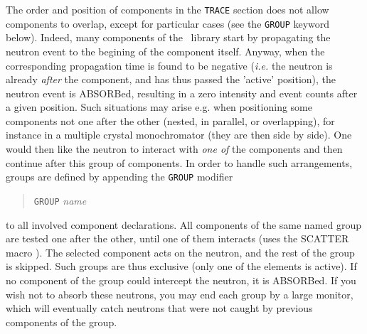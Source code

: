 The order and position of components in the \texttt{TRACE} section does not
allow components to overlap, except for particular cases (see the \texttt{GROUP} keyword below).
Indeed, many components of the \MCS\ library  start
by propagating the neutron event to the begining of the component itself.
Anyway, when the corresponding propagation time is found to be negative
({\it i.e.} the neutron is already \emph{after} the component, and has thus
passed the 'active' position), the neutron event is ABSORBed, resulting in a zero intensity and event counts after a given position. Such situations
may arise e.g. when positioning some components not one after the other (nested, in parallel, or overlapping), for
instance in a multiple crystal monochromator (they are then side by side). One
would then like the neutron to interact with \emph{one of} the components and
then continue after this group of components. In order to handle such
arrangements, groups are defined by appending the \texttt{GROUP} modifier
\begin{quote}
  \texttt{GROUP} \textit{name}
\end{quote}
to all involved component declarations. 
All components of the same named group are tested one after the other, until one of them interacts (uses the SCATTER macro ). The selected component acts on the neutron, and the rest of the group is skipped. Such groups are thus exclusive (only one of the elements is active).
If no component of the group could intercept the neutron, it is ABSORBed. If you wish not to absorb these neutrons, you may end each group by a large monitor, which will eventually catch neutrons that were not caught by previous components of the group.

